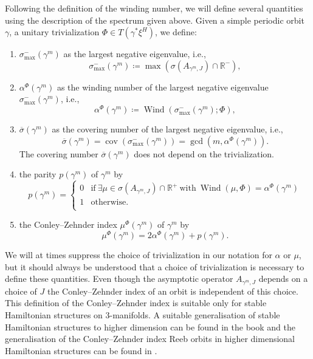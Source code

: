 \documentclass[11pt, a4paper]{amsart}
\DeclareMathOperator{\wind}{Wind}
\DeclareMathOperator{\cov}{cov}
\begin{document}
Following the definition of the winding number, we will define several quantities  using the description of the spectrum given above. Given a simple periodic orbit $\gamma$, a unitary trivialization $\Phi \in T(\gamma^* \xi^H)$, we define:

\begin{enumerate}
    \itemsep0.4em
    \item $\sigma_{\max}^{-}(\gamma^m)$ as the largest negative eigenvalue, i.e., $$\sigma_{\max}^{-}(\gamma^m)\coloneqq \max(\sigma(A_{\gamma^m,J}) \cap \mathbb{R}^{-}),$$ 
    \item $\alpha^{\Phi}(\gamma^m)$ as the winding number of the largest negative eigenvalue $\sigma_{\max}^{-}(\gamma^m)$, i.e., $$\alpha^{\Phi}(\gamma^m)\coloneqq \wind (\sigma_{\max}^{-}(\gamma^m); \Phi),$$ 
    \item $\overline{\sigma}(\gamma^m)$ as the covering number of the largest negative eigenvalue, i.e., $$\overline{\sigma}(\gamma^m )=\cov(\sigma_{\max}^{-}(\gamma^m)) = \gcd(m, \alpha^{\Phi}(\gamma^m)).$$ The covering number $\overline{\sigma}(\gamma^m)$ does not depend on the trivialization.
    \item the parity $p(\gamma^m)$ of $\gamma^m$ by
    \[  p(\gamma^m)= \left\{
    \begin{array}{ll}
        0 & \mathrm{if\ }\exists \mu \in \sigma(A_{\gamma^m,J}) \cap \mathbb{R}^{+} \mathrm{\ with\ } \wind (\mu, \Phi) = \alpha^{\Phi}(\gamma^m)\\
        1 & \mathrm{otherwise.} \\
    \end{array} 
\right. \]
    \item the Conley--Zehnder index $\mu^{\Phi}(\gamma^m)$ of $\gamma^m$ by
$$\mu^{\Phi}(\gamma^m)=2\alpha^{\Phi}(\gamma^m)+p(\gamma^m).$$
\end{enumerate}

We will at times suppress the choice of trivialization in our notation for $\alpha$ or $\mu$, but it should always be understood that a choice of trivialization is necessary to define these quantities. Even though the asymptotic operator $A_{\gamma^m,J}$ depends on a choice of $J$ the Conley--Zehnder index of an orbit is independent of this choice. This definition of the Conley--Zehnder index is suitable only for stable Hamiltonian structures on 3-manifolds. A suitable generalisation of stable Hamiltonian structures to higher dimension can be found in the book \cite[Section~6.1]{SFTwendl} and the generalisation of the Conley--Zehnder index Reeb orbits in higher dimensional Hamiltonian structures can be found in \cite[Section~3.4]{SFTwendl}. 
\end{document}
